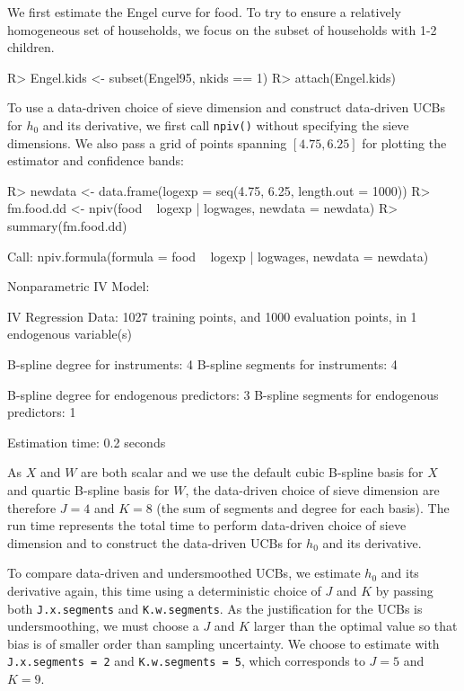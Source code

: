\documentclass[
]{jss}
\begin{document}
We first estimate the Engel curve for food. To try to ensure a
relatively homogeneous set of households, we focus on the subset of
households with 1-2 children.

\begin{CodeChunk}
\begin{CodeInput}
R> Engel.kids <- subset(Engel95, nkids == 1)
R> attach(Engel.kids)
\end{CodeInput}
\end{CodeChunk}

To use a data-driven choice of sieve dimension and construct data-driven
UCBs for \(h_0\) and its derivative, we first call \texttt{npiv()}
without specifying the sieve dimensions. We also pass a grid of points
spanning \([4.75, 6.25]\) for plotting the estimator and confidence
bands:

\begin{CodeChunk}
\begin{CodeInput}
R> newdata <- data.frame(logexp = seq(4.75, 6.25, length.out = 1000))
R> fm.food.dd <- npiv(food ~ logexp | logwages, newdata = newdata)
R> summary(fm.food.dd)
\end{CodeInput}
\begin{CodeOutput}
Call:
npiv.formula(formula = food ~ logexp | logwages, newdata = newdata)

Nonparametric IV Model:

IV Regression Data: 1027 training points, and 1000 evaluation points, in 1 endogenous variable(s)

B-spline degree for instruments:             4
B-spline segments for instruments:           4

B-spline degree for endogenous predictors:   3
B-spline segments for endogenous predictors: 1

Estimation time: 0.2 seconds
\end{CodeOutput}
\end{CodeChunk}

As \(X\) and \(W\) are both scalar and we use the default cubic B-spline
basis for \(X\) and quartic B-spline basis for \(W\), the data-driven
choice of sieve dimension are therefore \(J = 4\) and \(K = 8\) (the sum
of segments and degree for each basis). The run time represents the
total time to perform data-driven choice of sieve dimension and to
construct the data-driven UCBs for \(h_0\) and its derivative.

To compare data-driven and undersmoothed UCBs, we estimate \(h_0\) and
its derivative again, this time using a deterministic choice of \(J\)
and \(K\) by passing both \texttt{J.x.segments} and
\texttt{K.w.segments}. As the justification for the UCBs is
undersmoothing, we must choose a \(J\) and \(K\) larger than the optimal
value so that bias is of smaller order than sampling uncertainty. We
choose to estimate with \texttt{J.x.segments\ =\ 2} and
\texttt{K.w.segments\ =\ 5}, which corresponds to \(J = 5\) and
\(K = 9\).
\end{document}
